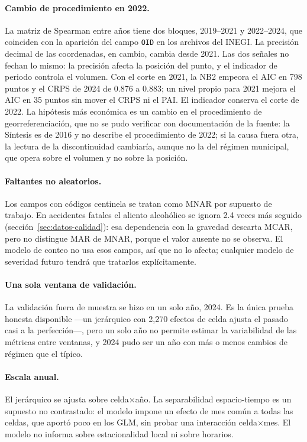 \paragraph{Cambio de procedimiento en 2022.} La matriz de Spearman entre años
tiene dos bloques, 2019--2021 y 2022--2024, que coinciden con la aparición del
campo \texttt{OID} en los archivos del INEGI. La precisión decimal de las
coordenadas, en cambio, cambia desde 2021. Las dos señales no fechan lo mismo:
la precisión afecta la posición del punto, y el indicador de periodo controla
el volumen. Con el corte en 2021, la NB2 empeora el AIC en 798 puntos y el CRPS
de 2024 de 0.876 a 0.883; un nivel propio para 2021 mejora el AIC en 35 puntos
sin mover el CRPS ni el PAI. El indicador conserva el corte de 2022. La
hipótesis más económica es un cambio en el procedimiento de
georreferenciación, que no se pudo verificar con documentación de la fuente: la
Síntesis es de 2016 y no describe el procedimiento de 2022; si la
causa fuera otra, la lectura de la discontinuidad cambiaría, aunque no la del
régimen municipal, que opera sobre el volumen y no sobre la posición.

\paragraph{Faltantes no aleatorios.} Los campos con códigos centinela se tratan
como MNAR por supuesto de trabajo. En accidentes fatales el aliento alcohólico
se ignora 2.4 veces más seguido (sección~\ref{sec:datos-calidad}): esa
dependencia con la gravedad descarta MCAR, pero no distingue MAR de MNAR, porque
el valor ausente no se observa. El modelo de conteo no usa esos campos, así que
no lo afecta; cualquier modelo de severidad futuro
tendrá que tratarlos explícitamente.

\paragraph{Una sola ventana de validación.} La validación fuera de muestra se
hizo en un solo año, 2024. Es la única prueba honesta disponible —un
jerárquico con 2,270 efectos de celda ajusta el pasado casi a la perfección—,
pero un solo año no permite estimar la variabilidad de las métricas entre
ventanas, y 2024 pudo ser un año con más o menos cambios de régimen que el
típico.

\paragraph{Escala anual.} El jerárquico se ajusta sobre celda$\times$año. La
separabilidad espacio-tiempo es un supuesto no contrastado: el modelo impone un
efecto de mes común a todas las celdas, que aportó poco en los GLM, sin probar
una interacción celda$\times$mes. El modelo no informa sobre estacionalidad
local ni sobre horarios.

